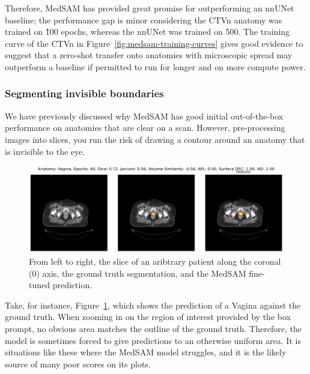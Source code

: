\documentclass[11pt,twoside]{report}
\begin{document}
Therefore, MedSAM has provided great promise for outperforming an nnUNet baseline; the performance gap is minor considering the CTVn anatomy was trained on \~100 epochs, whereas the nnUNet was trained on 500. The training curve of the CTVn in Figure~\ref{fig:medsam-training-curves} gives good evidence to suggest that a zero-shot transfer onto anatomies with microscopic spread may outperform a baseline if permitted to run for longer and on more compute power. 

\subsubsection{Segmenting invisible boundaries}

We have previously discussed why MedSAM has good initial out-of-the-box performance on anatomies that are clear on a scan. However, pre-processing images into slices, you run the risk of drawing a contour around an anatomy that is invisible to the eye.

\begin{figure}[H]
  \centering
  \includegraphics[width=.85\linewidth]{../../research/source/code/SAM_Med/4_train_box_prompt/invisible-vagina.png}

  \caption{From left to right, the slice of an aribtrary patient along the coronal (0) axis, the ground truth segmentation, and the MedSAM fine-tuned prediction.}\label{fig:invisible-vagina}
\end{figure}

Take, for instance, Figure~\ref{fig:invisible-vagina}, which shows the prediction of a Vagina against the ground truth. When zooming in on the region of interest provided by the box prompt, no obvious area matches the outline of the ground truth. Therefore, the model is sometimes forced to give predictions to an otherwise uniform area. It is situations like these where the MedSAM model struggles, and it is the likely source of many poor scores on its plots.
\end{document}
